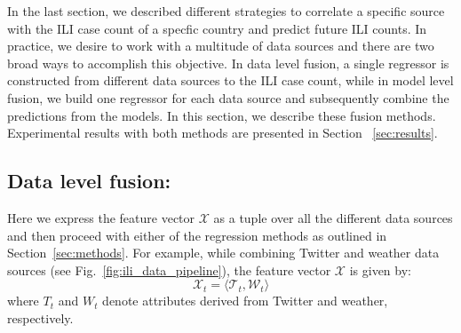 %
%

In the last section, we described different strategies to correlate a specific source with the ILI case count of a specfic country and predict future ILI counts. In practice, we desire to work with a multitude of data sources and there are two broad ways to accomplish this objective. In data level fusion, a single regressor is constructed from different data     sources to the ILI case count, while in model level fusion, we build one regressor for each data source and subsequently combine the predictions from the models. In this section, we describe these fusion methods. Experimental results with
both methods are presented in Section ~\ref{sec:results}.


\subsection{\label{sec:fusion:data} Data level fusion:}
Here we express the feature vector $\mathcal{X}$ as a tuple over all the different data 
sources and then proceed with either of the regression methods as outlined in Section~\ref{sec:methods}.
For example, while combining Twitter and weather data sources (see Fig.~\ref{fig:ili_data_pipeline}), the 
feature vector $\mathcal{X}$ is given by:
\[\mathcal{X}_t = \langle \mathcal{T}_t, \mathcal{W}_t \rangle
\]
where $T_t$ and $W_t$ denote attributes derived from Twitter and weather, respectively.


